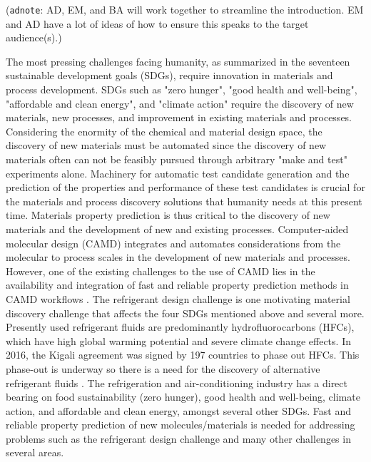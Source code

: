 \documentclass[journal=jacsat,manuscript=article]{achemso}
\newcommand{\adnote}[1]{{\color{OliveGreen} (\texttt{adnote}: #1)}}
\begin{document}
\adnote{AD, EM, and BA will work together to streamline the introduction. EM and AD have a lot of ideas of how to ensure this speaks to the target audience(s).}

The most pressing challenges facing humanity, as summarized in the seventeen sustainable development goals (SDGs), require innovation in materials and process development. 
SDGs such as "zero hunger", "good health and well-being", "affordable and clean energy", and "climate action" \cite{unitednations17GOALSSustainable2015} require the discovery of new materials, new processes, and improvement in existing materials and processes.  
Considering the enormity of the chemical and material design space, the discovery of new materials must be automated since the discovery of new materials often can not be feasibly pursued through arbitrary "make and test" experiments alone. 
Machinery for automatic test candidate generation and the prediction of the properties and performance of these test candidates is crucial for the materials and process discovery solutions that humanity needs at this present time.
Materials property prediction is thus critical to the discovery of new materials and the development of new and existing processes. 
Computer-aided molecular design (CAMD) integrates and automates considerations from the molecular to process scales in the development of new materials and processes. 
However, one of the existing challenges to the use of CAMD lies in the availability and integration of fast and reliable property prediction methods in CAMD workflows \cite{adjimanProcessSystemsEngineering2021}.
The refrigerant design challenge is one motivating material discovery challenge that affects the four SDGs mentioned above and several more. 
Presently used refrigerant fluids are predominantly hydrofluorocarbons (HFCs), which have high global warming potential and severe climate change effects. In 2016, the Kigali agreement was signed by 197 countries to phase out HFCs. 
This phase-out is underway so there is a need for the discovery of alternative refrigerant fluids
\cite{departmentofecologystateofwashingtonHydrofluorocarbons2023, usaepaReducingHydrofluorocarbonHFC2014, davenportNationsFightingPowerful2016, mcgrathClimateChangeMonumental2016, veldersLargeContributionProjected2009}. 
The refrigeration and air-conditioning industry has a direct bearing on food sustainability (zero hunger), good health and well-being, climate action, and affordable and clean energy, amongst several other SDGs. 
Fast and reliable property prediction of new molecules/materials is needed for addressing problems such as the refrigerant design challenge and many other challenges in several areas.
\end{document}
